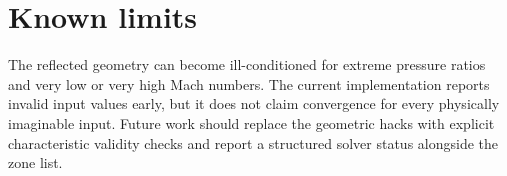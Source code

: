 \documentclass[11pt]{article}
\begin{document}
\section{Known limits}

The reflected geometry can become ill-conditioned for extreme pressure ratios
and very low or very high Mach numbers.  The current implementation reports
invalid input values early, but it does not claim convergence for every
physically imaginable input.  Future work should replace the geometric hacks
with explicit characteristic validity checks and report a structured solver
status alongside the zone list.
\end{document}
